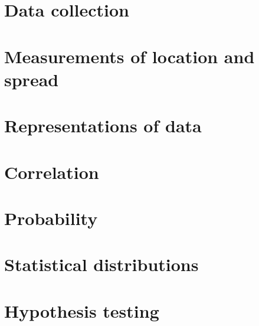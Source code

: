 \chapter{Data collection}


\chapter{Measurements of location and spread}


\chapter{Representations of data}


\chapter{Correlation}


\chapter{Probability}


\chapter{Statistical distributions}


\chapter{Hypothesis testing}
